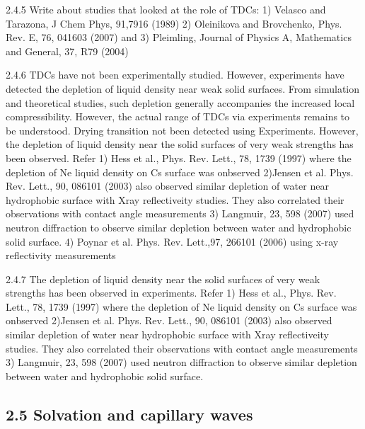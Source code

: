 \par 2.4.5 Write about studies that looked at the role of TDCs: 1) Velasco and Tarazona, J Chem Phys, 91,7916 (1989) 2) Oleinikova and Brovchenko, Phys. Rev. E, 76, 041603 (2007) and 3) Pleimling, Journal of Physics A, Mathematics and General, 37, R79 (2004)
\par 2.4.6 TDCs have not been experimentally studied. However, experiments have detected the depletion of liquid density near weak solid surfaces. From simulation and theoretical studies, such depletion generally accompanies the increased local compressibility.  However, the actual range of TDCs via experiments remains to be understood. Drying transition not been detected using Experiments. However, the depletion of liquid density near the solid surfaces of very weak strengths has been observed. Refer 1) Hess et al., Phys. Rev. Lett., 78, 1739 (1997) where the depletion of Ne liquid density on Cs surface was onbserved 2)Jensen et al. Phys. Rev. Lett., 90, 086101 (2003) also observed similar depletion of water near hydrophobic surface with Xray reflectiveity studies. They also correlated their observations with contact angle measurements 3) Langmuir, 23, 598 (2007) used neutron diffraction to observe similar depletion between water and hydrophobic solid surface. 4) Poynar et al. Phys. Rev. Lett.,97, 266101 (2006) using x-ray reflectivity measurements
\par 2.4.7 The depletion of liquid density near the solid surfaces of very weak strengths has been observed in experiments. Refer 1) Hess et al., Phys. Rev. Lett., 78, 1739 (1997) where the depletion of Ne liquid density on Cs surface was onbserved 2)Jensen et al. Phys. Rev. Lett., 90, 086101 (2003) also observed similar depletion of water near hydrophobic surface with Xray reflectiveity studies. They also correlated their observations with contact angle measurements 3) Langmuir, 23, 598 (2007) used neutron diffraction to observe similar depletion between water and hydrophobic solid surface.\subsection{2.5 Solvation and capillary waves}

